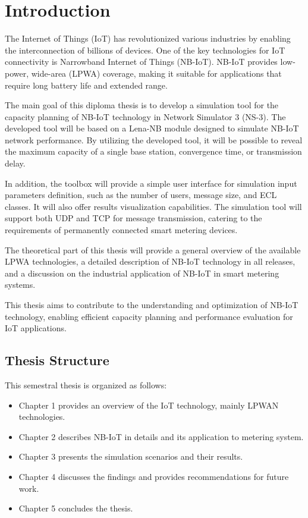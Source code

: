 \chapter*{Introduction}
{}

The Internet of Things (IoT) has revolutionized various industries by enabling the interconnection of billions of devices. One of the key technologies for IoT connectivity is Narrowband Internet of Things (NB-IoT). NB-IoT provides low-power, wide-area (LPWA) coverage, making it suitable for applications that require long battery life and extended range.

The main goal of this diploma thesis is to develop a simulation tool for the capacity planning of NB-IoT technology in Network Simulator 3 (NS-3). The developed tool will be based on a Lena-NB module designed to simulate NB-IoT network performance. By utilizing the developed tool, it will be possible to reveal the maximum capacity of a single base station, convergence time, or transmission delay.

In addition, the toolbox will provide a simple user interface for simulation input parameters definition, such as the number of users, message size, and ECL classes. It will also offer results visualization capabilities. The simulation tool will support both UDP and TCP for message transmission, catering to the requirements of permanently connected smart metering devices.

The theoretical part of this thesis will provide a general overview of the available LPWA technologies, a detailed description of NB-IoT technology in all releases, and a discussion on the industrial application of NB-IoT in smart metering systems.

This thesis aims to contribute to the understanding and optimization of NB-IoT technology, enabling efficient capacity planning and performance evaluation for IoT applications.

\section*{Thesis Structure}
This semestral thesis is organized as follows:

\begin{itemize}
    \item Chapter 1 provides an overview of the IoT technology, mainly LPWAN technologies.
    \item Chapter 2 describes NB-IoT in details and its application to metering system.
    \item Chapter 3 presents the simulation scenarios and their results.
    \item Chapter 4 discusses the findings and provides recommendations for future work.
    \item Chapter 5 concludes the thesis.
\end{itemize}